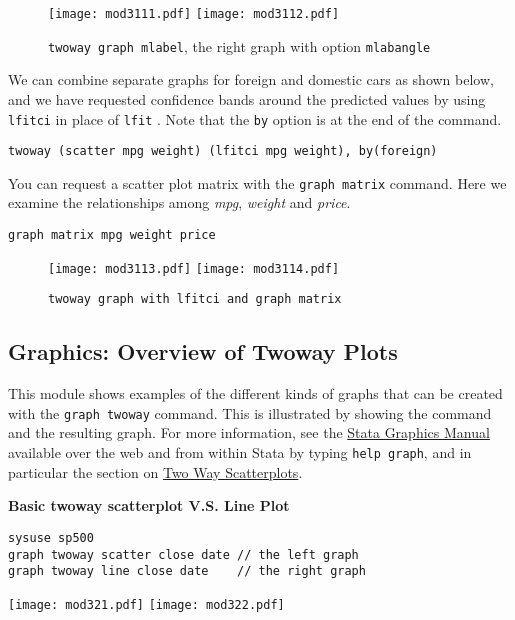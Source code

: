 \begin{figure}[!h]
\centering
\texttt{[image: mod3111.pdf]}
\texttt{[image: mod3112.pdf]}
\caption{\lstinline{twoway graph mlabel}, the right graph with option \lstinline{mlabangle}\label{twowayx}}
\end{figure}


We can combine separate graphs for foreign and domestic cars as shown below, and we have requested confidence bands around the predicted values by using \lstinline{lfitci} in place of \lstinline{lfit} .  Note that the \lstinline{by} option is at the end of the command.

\begin{lstlisting}
twoway (scatter mpg weight) (lfitci mpg weight), by(foreign)
\end{lstlisting}

You can request a scatter plot matrix with the \lstinline{graph matrix} command. Here we examine the relationships among \textit{mpg}, \textit{weight} and \textit{price}.

\begin{lstlisting}
graph matrix mpg weight price
\end{lstlisting}

\begin{figure}[!htbp]
\centering
\texttt{[image: mod3113.pdf]}
\texttt{[image: mod3114.pdf]}
\caption{\lstinline{twoway graph with lfitci and graph matrix}\label{twowayxx}}
\end{figure}


\subsection{Graphics: Overview of Twoway Plots}
This module shows examples of the different kinds of graphs that can be created with the \lstinline{graph twoway} command.  This is illustrated by showing the command and the resulting graph.  For more information, see the \href{http://www.stata.com/help.cgi?graph}{Stata Graphics Manual} available over the web and from within Stata by typing \lstinline{help graph}, and in particular the section on \href{http://www.stata.com/help.cgi?scatter}{Two Way Scatterplots}.

\textbf{Basic twoway scatterplot V.S. Line Plot}
\begin{lstlisting}
sysuse sp500
graph twoway scatter close date // the left graph
graph twoway line close date    // the right graph
\end{lstlisting}
\begin{center}
\texttt{[image: mod321.pdf]}
\texttt{[image: mod322.pdf]}
\end{center}

